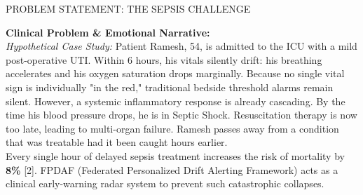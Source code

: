 \documentclass[11pt, a4paper]{article}
\begin{document}
\noindent
{}%
\hfill
{}%
\hfill
{}
\vspace{0.6cm}

{\Large\color{sectionBlue} PROBLEM STATEMENT: THE SEPSIS CHALLENGE}
\vspace{0.2cm}

\textbf{Clinical Problem \& Emotional Narrative:}\\
\textit{Hypothetical Case Study:} Patient Ramesh, 54, is admitted to the ICU with a mild post-operative UTI. Within 6 hours, his vitals silently drift: his breathing accelerates and his oxygen saturation drops marginally. Because no single vital sign is individually "in the red," traditional bedside threshold alarms remain silent. However, a systemic inflammatory response is already cascading. By the time his blood pressure drops, he is in Septic Shock. Resuscitation therapy is now too late, leading to multi-organ failure. Ramesh passes away from a condition that was treatable had it been caught hours earlier.\\[0.2cm]
Every single hour of delayed sepsis treatment increases the risk of mortality by \textbf{8\%} [2]. FPDAF (Federated Personalized Drift Alerting Framework) acts as a clinical early-warning radar system to prevent such catastrophic collapses.
\end{document}
